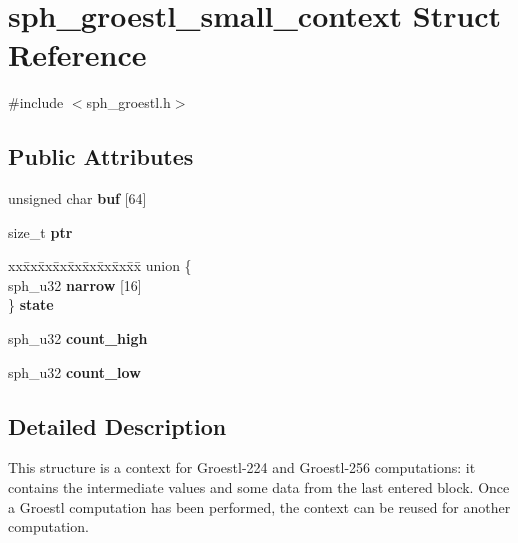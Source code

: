 \hypertarget{structsph__groestl__small__context}{}\section{sph\+\_\+groestl\+\_\+small\+\_\+context Struct Reference}
\label{structsph__groestl__small__context}


{\ttfamily \#include $<$sph\+\_\+groestl.\+h$>$}

\subsection*{Public Attributes}
\begin{DoxyCompactItemize}
\item 
\mbox{\label{structsph__groestl__small__context_a7b791b4f662112ae7a6d0b1cce622570}} 
unsigned char {\bfseries buf} \mbox{[}64\mbox{]}
\item 
\mbox{\label{structsph__groestl__small__context_a941838de2677ce8ff1be7423d6a6fa92}} 
size\+\_\+t {\bfseries ptr}
\item 
\mbox{\label{structsph__groestl__small__context_af060ce8ac215f1b0431462defd487612}} 
\begin{tabbing}
xx\=xx\=xx\=xx\=xx\=xx\=xx\=xx\=xx\=\kill
union \{\\
\>sph\_u32 {\bfseries narrow} \mbox{[}16\mbox{]}\\
\} {\bfseries state}\\

\end{tabbing}\item 
\mbox{\label{structsph__groestl__small__context_a237030eb3c8435ff23deae1f2db6d1d5}} 
sph\+\_\+u32 {\bfseries count\+\_\+high}
\item 
\mbox{\label{structsph__groestl__small__context_ab5526e6eb4d083f7f20536a8d83c6520}} 
sph\+\_\+u32 {\bfseries count\+\_\+low}
\end{DoxyCompactItemize}


\subsection{Detailed Description}
This structure is a context for Groestl-\/224 and Groestl-\/256 computations\+: it contains the intermediate values and some data from the last entered block. Once a Groestl computation has been performed, the context can be reused for another computation.

